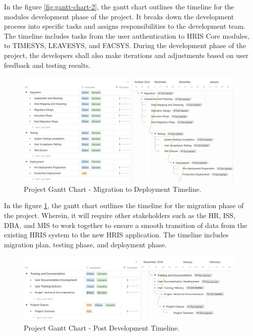     In the figure \ref{fig:gantt-chart-2}, the gantt chart outlines the timeline for the modules development phase of the project. It breaks down the development process into specific tasks and assigns responsibilities to the development team. The timeline includes tasks from the user authentication to HRIS Core modules, to TIMESYS, LEAVESYS, and FACSYS. During the development phase of the project, the developers shall also make iterations and adjustments based on user feedback and testing results.

    \begin{figure}[H]
        \centering
        \includegraphics[width=1\linewidth]{figures/images/diagrams/gantt/gantt-chart-3.png}
        \caption{Project Gantt Chart - Migration to Deployment Timeline.}
        \label{fig:gantt-chart-3}
    \end{figure}

    In the figure \ref{fig:gantt-chart-3}, the gantt chart outlines the timeline for the migration phase of the project. Wherein, it will require other stakeholders such as the HR, ISS, DBA, and MIS to work together to ensure a smooth transition of data from the existing HRIS system to the new HRIS application. The timeline includes migration plan, testing phase, and deployment phase.

    \begin{figure}[H]
        \centering
        \includegraphics[width=1\linewidth]{figures/images/diagrams/gantt/gantt-chart-4.png}
        \caption{Project Gantt Chart - Post Development Timeline.}
        \label{fig:gantt-chart-4}
    \end{figure}


